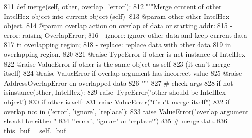 \begin{DoxyCode}
811     \textcolor{keyword}{def }\hyperlink{classsoftware_1_1chipwhisperer_1_1capture_1_1utils_1_1IntelHex_1_1IntelHex_a8f12aea49042cd61c56c2d650fab5fa2}{merge}(self, other, overlap='error'):
812         \textcolor{stringliteral}{"""Merge content of other IntelHex object into current object (self).}
813 \textcolor{stringliteral}{        @param  other   other IntelHex object.}
814 \textcolor{stringliteral}{        @param  overlap action on overlap of data or starting addr:}
815 \textcolor{stringliteral}{                        - error: raising OverlapError;}
816 \textcolor{stringliteral}{                        - ignore: ignore other data and keep current data}
817 \textcolor{stringliteral}{                                  in overlapping region;}
818 \textcolor{stringliteral}{                        - replace: replace data with other data}
819 \textcolor{stringliteral}{                                  in overlapping region.}
820 \textcolor{stringliteral}{}
821 \textcolor{stringliteral}{        @raise  TypeError       if other is not instance of IntelHex}
822 \textcolor{stringliteral}{        @raise  ValueError      if other is the same object as self }
823 \textcolor{stringliteral}{                                (it can't merge itself)}
824 \textcolor{stringliteral}{        @raise  ValueError      if overlap argument has incorrect value}
825 \textcolor{stringliteral}{        @raise  AddressOverlapError    on overlapped data}
826 \textcolor{stringliteral}{        """}
827         \textcolor{comment}{# check args}
828         \textcolor{keywordflow}{if} \textcolor{keywordflow}{not} isinstance(other, IntelHex):
829             \textcolor{keywordflow}{raise} TypeError(\textcolor{stringliteral}{'other should be IntelHex object'})
830         \textcolor{keywordflow}{if} other \textcolor{keywordflow}{is} self:
831             \textcolor{keywordflow}{raise} ValueError(\textcolor{stringliteral}{"Can't merge itself"})
832         \textcolor{keywordflow}{if} overlap \textcolor{keywordflow}{not} \textcolor{keywordflow}{in} (\textcolor{stringliteral}{'error'}, \textcolor{stringliteral}{'ignore'}, \textcolor{stringliteral}{'replace'}):
833             \textcolor{keywordflow}{raise} ValueError(\textcolor{stringliteral}{"overlap argument should be either "}
834                 \textcolor{stringliteral}{"'error', 'ignore' or 'replace'"})
835         \textcolor{comment}{# merge data}
836         this\_buf = self.\hyperlink{classsoftware_1_1chipwhisperer_1_1capture_1_1utils_1_1IntelHex_1_1IntelHex_a9acc18c6165db7a6540c07688a8e09ac}{\_buf}

\end{DoxyCode}
